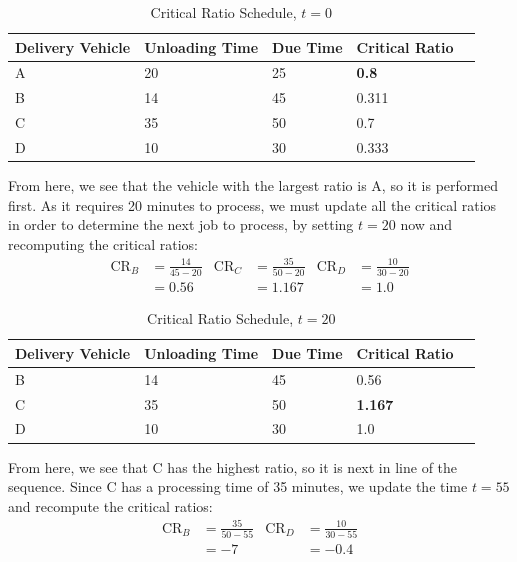 \documentclass[12pt]{article}
\begin{document}
\begin{table}[H]
    \centering
    \begin{tabular}{p{1.8cm} p{3cm} p{1.8cm} p{1.8cm} p{1.8cm}} \toprule
        \textbf{Delivery Vehicle} & \textbf{Unloading Time} & \textbf{Due Time} & \textbf{Critical Ratio} \\ \midrule 
        A & 20 & 25 & \textbf{0.8} \\ 
        B & 14 & 45 & 0.311 \\ 
        C & 35 & 50 & 0.7 \\ 
        D & 10 & 30 & 0.333 \\ \bottomrule
    \end{tabular}
    \caption{Critical Ratio Schedule, $t = 0$}
    \label{tab:4-CR1}
\end{table}

\noindent From here, we see that the vehicle with the largest ratio is A, so it is performed first. As it requires 20 minutes to process, we must update all the critical ratios in order to determine the next job to process, by setting $t=20$ now and recomputing the critical ratios: \begin{align*}
    \text{CR}_B &= \frac{14}{45 - 20} & \text{CR}_C &= \frac{35}{50 - 20} & \text{CR}_D &= \frac{10}{30 - 20} \\ 
    &= 0.56 & &= 1.167 & &= 1.0
\end{align*}

\begin{table}[H]
    \centering
    \begin{tabular}{p{1.8cm} p{3cm} p{1.8cm} p{1.8cm} p{1.8cm}} \toprule
        \textbf{Delivery Vehicle} & \textbf{Unloading Time} & \textbf{Due Time} & \textbf{Critical Ratio} \\ \midrule 
        B & 14 & 45 & 0.56 \\ 
        C & 35 & 50 & \textbf{1.167} \\ 
        D & 10 & 30 & 1.0 \\ \bottomrule
    \end{tabular}
    \caption{Critical Ratio Schedule, $t = 20$}
    \label{tab:4-CR2}
\end{table}

\noindent From here, we see that C has the highest ratio, so it is next in line of the sequence. Since C has a processing time of 35 minutes, we update the time $t = 55$ and recompute the critical ratios: \begin{align*}
    \text{CR}_B &= \frac{35}{50 - 55} & \text{CR}_D &= \frac{10}{30 - 55} \\ 
    &= -7 & &= -0.4
\end{align*}
\end{document}
